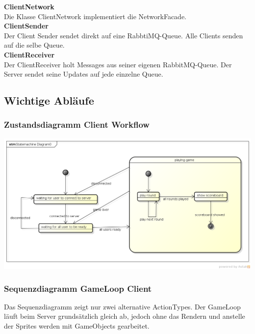 \documentclass[11pt]{scrartcl}
\begin{document}
\textbf{ClientNetwork}\\
Die Klasse ClientNetwork implementiert die NetworkFacade.\\

\textbf{ClientSender}\\
Der Client Sender sendet direkt auf eine RabbtiMQ-Queue. Alle Clients senden auf die selbe Queue.\\

\textbf{ClientReceiver}\\
Der ClientReceiver holt Messages aus seiner eigenen RabbitMQ-Queue. Der Server sendet seine Updates auf jede einzelne Queue.

\newpage

\subsection{Wichtige Abläufe}
\subsubsection{Zustandsdiagramm Client Workflow}
\includegraphics[scale=0.43]{StatemachineClient}

\newpage

\subsubsection{Sequenzdiagramm GameLoop Client}
Das Sequenzdiagramm zeigt nur zwei alternative ActionTypes. Der GameLoop läuft beim Server grundsätzlich gleich ab, jedoch ohne das Rendern und anstelle der Sprites werden mit GameObjects gearbeitet.\\
\end{document}
